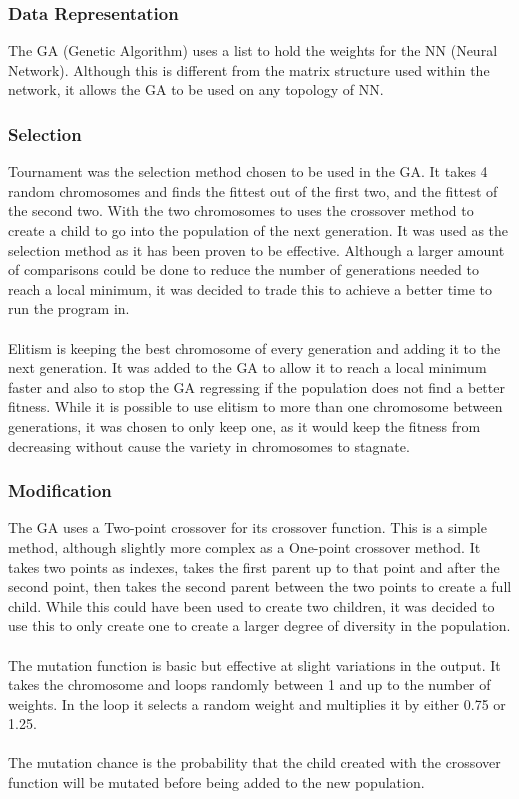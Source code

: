 \documentclass[12pt]{article}
\begin{document}
\subsubsection{Data Representation}
The GA (Genetic Algorithm) uses a list to hold the weights for the NN (Neural Network). Although this is different from the matrix structure used within the network, it allows the GA to be used on any topology of NN. 

\subsubsection{Selection}
Tournament was the selection method chosen to be used in the GA. It takes 4 random chromosomes and finds the fittest out of the first two, and the fittest of the second two. With the two chromosomes to uses the crossover method to create a child to go into the population of the next generation. It was used as the selection method as it has been proven to be effective\cite{FoundationsOfGA}. Although a larger amount of comparisons could be done to reduce the number of generations needed to reach a local minimum, it was decided to trade this to achieve a better time to run the program in.\\\\
Elitism is keeping the best chromosome of every generation and adding it to the next generation. It was added to the GA to allow it to reach a local minimum faster and also to stop the GA regressing if the population does not find a better fitness. While it is possible to use elitism to more than one chromosome between generations, it was chosen to only keep one, as it would keep the fitness from decreasing without cause the variety in chromosomes to stagnate.

\subsubsection{Modification}
The GA uses a Two-point crossover for its crossover function. This is a simple 	method, although slightly more complex as a One-point crossover method. It takes two points as indexes, takes the first parent up to that point and after the second point, then takes the second parent between the two points to create a full child. While this could have been used to create two children, it was decided to use this to only create one to create a larger degree of diversity in the population.\\\\
The mutation function is basic but effective at slight variations in the output. It takes the chromosome and loops randomly between 1 and up to the number of weights. In the loop it selects a random weight and multiplies it by either 0.75 or 1.25. \\\\
The mutation chance is the probability that the child created with the crossover function will be mutated before being added to the new population.
\end{document}
